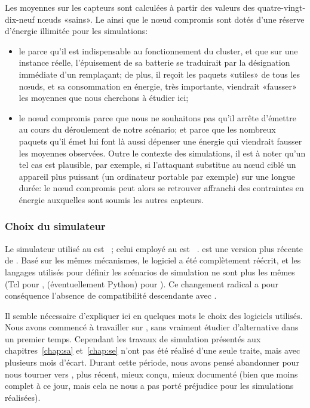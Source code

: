 Les moyennes sur les capteurs sont calculées à partir des valeurs des quatre-vingt-dix-neuf nœuds «sains».
Le \ch ainsi que le nœud compromis sont dotés d'une réserve d'énergie illimitée pour les simulations:
\begin{itemize}
    \item le \ch parce qu'il est indispensable au fonctionnement du cluster, et que sur une instance réelle, l'épuisement de sa batterie se traduirait par la désignation immédiate d'un remplaçant; de plus, il reçoit les paquets «utiles» de tous les nœuds, et sa consommation en énergie, très importante, viendrait «fausser» les moyennes que nous cherchons à étudier ici;
    \item le nœud compromis parce que nous ne souhaitons pas qu'il arrête d'émettre au cours du déroulement de notre scénario; et parce que les nombreux paquets qu'il émet lui font là aussi dépenser une énergie qui viendrait fausser les moyennes observées. Outre le contexte des simulations, il est à noter qu'un tel cas est plausible, par exemple, si l'attaquant substitue au nœud ciblé un appareil plus puissant (un ordinateur portable par exemple) sur une longue durée: le nœud compromis peut alors se retrouver affranchi des contraintes en énergie auxquelles sont soumis les autres capteurs.
\end{itemize}

        \subsubsection{Choix du simulateur}

Le simulateur utilisé au  est \nsii~\cite{ns2}; celui employé au  est \nsiii~\cite{ns3}.
\nsiii est une version plus récente de \nsii.
Basé sur les mêmes mécanismes, le logiciel a été complètement réécrit, et les langages utilisés pour définir les scénarios de simulation ne sont plus les mêmes (Tcl pour \nsii, \cpp (éventuellement Python) pour \nsiii).
Ce changement radical a pour conséquence l'absence de compatibilité descendante avec \nsii.

Il semble nécessaire d'expliquer ici en quelques mots le choix des logiciels utilisés.
Nous avons commencé à travailler sur \nsii, sans vraiment étudier d'alternative dans un premier temps.
Cependant les travaux de simulation présentés aux chapitres~\ref{chap:sa} et~\ref{chap:se} n'ont pas été réalisé d'une seule traite, mais avec plusieurs mois d'écart.
Durant cette période, nous avons pensé abandonner \nsii pour nous tourner vers \nsiii, plus récent, mieux conçu, mieux documenté (bien que moins complet à ce jour, mais cela ne nous a pas porté préjudice pour les simulations réalisées).

